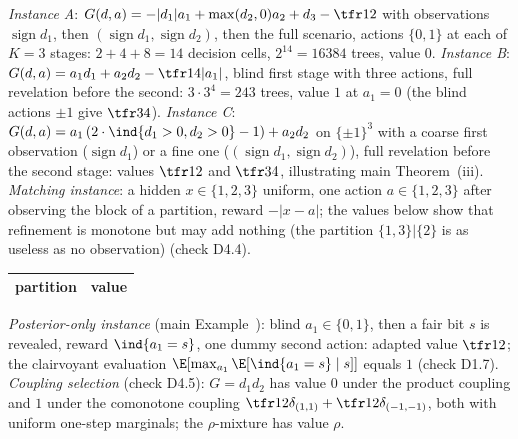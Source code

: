 \emph{Instance A}: $G(d,a)=-|d_1|a_1+\max(d_2,0)a_2+d_3-\tfr12$ with observations $\operatorname{sign}d_1$, then $(\operatorname{sign}d_1,\operatorname{sign}d_2)$, then the full scenario, actions $\{0,1\}$ at each of $K=3$ stages: $2+4+8=14$ decision cells, $2^{14}=16384$ trees, value $0$. \emph{Instance B}: $G(d,a)=a_1d_1+a_2d_2-\tfr14|a_1|$, blind first stage with three actions, full revelation before the second: $3\cdot3^4=243$ trees, value $1$ at $a_1=0$ (the blind actions $\pm1$ give $\tfr34$). \emph{Instance C}: $G(d,a)=a_1\,(2\cdot\ind{d_1>0,d_2>0}-1)+a_2d_2$ on $\{\pm1\}^3$ with a coarse first observation ($\operatorname{sign}d_1$) or a fine one ($(\operatorname{sign}d_1,\operatorname{sign}d_2)$), full revelation before the second stage: values $\tfr12$ and $\tfr34$, illustrating main Theorem~(iii). \emph{Matching instance}: a hidden $x\in\{1,2,3\}$ uniform, one action $a\in\{1,2,3\}$ after observing the block of a partition, reward $-|x-a|$; the values below show that refinement is monotone but may add nothing (the partition $\{1,3\}|\{2\}$ is as useless as no observation) (check D4.4).
\begin{center}\small
\begin{tabular}{lc}
\toprule
partition & value\\
\midrule

\bottomrule
\end{tabular}
\end{center}
\emph{Posterior-only instance} (main Example~): blind $a_1\in\{0,1\}$, then a fair bit $s$ is revealed, reward $\ind{a_1=s}$, one dummy second action: adapted value $\tfr12$; the clairvoyant evaluation $\E[\max_{a_1}\E[\ind{a_1=s}\mid s]]$ equals $1$ (check D1.7). \emph{Coupling selection} (check D4.5): $G=d_1d_2$ has value $0$ under the product coupling and $1$ under the comonotone coupling $\tfr12\delta_{(1,1)}+\tfr12\delta_{(-1,-1)}$, both with uniform one-step marginals; the $\rho$-mixture has value $\rho$.
